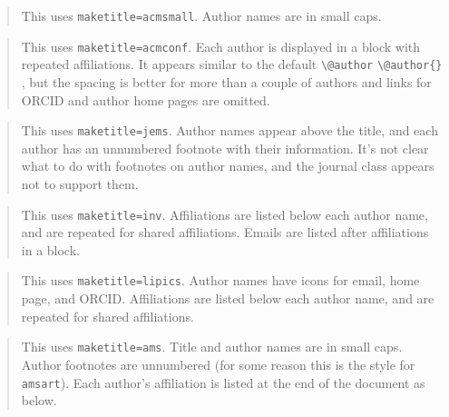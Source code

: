 \documentclass{article}
\newcommand{\cmd}[2][]{%
  \def\FirstArg{#1}%
  \ifx\FirstArg\empty%
    \texttt{\textbackslash{}#2}%
  \else%
    \texttt{\textbackslash{}#2\{#1\}}%
  \fi
}
\begin{document}
\newpage
{}
\setcounter{footnote}{0}
\METAC@acmsmall@maketitle
\begin{quote}
This uses \texttt{maketitle=acmsmall}. Author names are in small caps.
\end{quote}
\label{acmsmall}

\newpage
{}
\label{acmconf}
\setcounter{footnote}{0}
\savenotes
\METAC@acmconf@maketitle
\spewnotes
\begin{quote}
This uses \texttt{maketitle=acmconf}. Each author is displayed in a block with repeated affiliations.
It appears similar to the default \cmd{@author}, but the spacing is better for more than a couple of
authors and links for ORCID and author home pages are omitted.
\end{quote}

\newpage
{}
\label{jems}
\setcounter{footnote}{0}
\METAC@jems@maketitle
\begin{quote}
This uses \texttt{maketitle=jems}. Author names appear above the title, and each author has an unnumbered footnote with their
information. It's not clear what to do with footnotes on author names, and the journal class appears not to support
them.
\end{quote}

\newpage
{}
\label{inv}
\setcounter{footnote}{0}
\begin{savenotes}
\METAC@inv@maketitle
\end{savenotes}

\begin{quote}
This uses \texttt{maketitle=inv}. Affiliations are listed below each author name, and are repeated for shared
affiliations. Emails are listed after affiliations in a block.
\end{quote}

\newpage
{}
\label{lipics}
\setcounter{footnote}{0}
\METAC@lipics@maketitle
\begin{quote}
This uses \texttt{maketitle=lipics}. Author names have icons for email, home page, and ORCID.
Affiliations are listed below each author name, and are repeated for shared
affiliations.
\end{quote}

\newpage
{}
\label{ams}
\setcounter{footnote}{0}
\METAC@ams@maketitle
\begin{quote}
This uses \texttt{maketitle=ams}. Title and author names are in small caps.
Author footnotes are unnumbered (for some reason this is the style
for \texttt{amsart}). Each author's affiliation is listed at the end of the document as below.
\end{quote}

\makeatother
\end{document}
